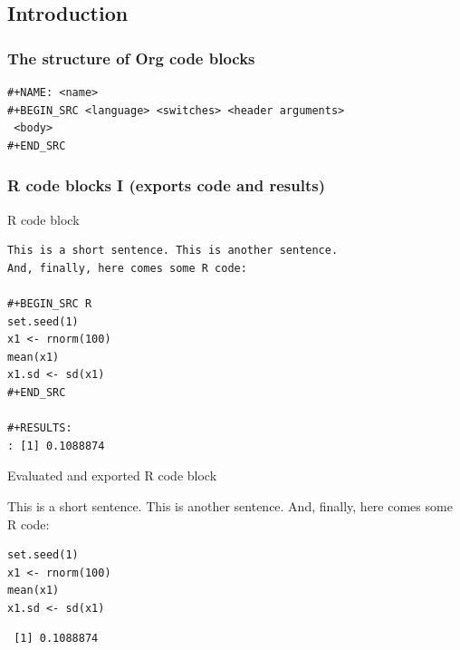 \documentclass[bigger]{beamer}
\begin{document}
\subsection{Introduction}
\label{sec-3-1}
\begin{frame}[fragile]
\frametitle{The structure of Org code blocks}
\label{sec-3-1-1}


\begin{small}

\begin{verbatim}
#+NAME: <name>
#+BEGIN_SRC <language> <switches> <header arguments>
 <body>
#+END_SRC
\end{verbatim}
\end{small}
\end{frame}
\begin{frame}[fragile,t, shrink = 15]
\frametitle{R code blocks I (exports code and results)}
\label{sec-3-1-2}
\begin{block}{R code block}
\label{sec-3-1-2-1}


\begin{verbatim}
This is a short sentence. This is another sentence. 
And, finally, here comes some R code:

#+BEGIN_SRC R
set.seed(1)
x1 <- rnorm(100) 
mean(x1) 
x1.sd <- sd(x1) 
#+END_SRC

#+RESULTS:
: [1] 0.1088874
\end{verbatim}
\end{block}
\begin{block}{Evaluated and exported R code block}
\label{sec-3-1-2-2}


This is a short sentence. This is another sentence. And, finally, here comes some R code:

\lstset{language=R}
\begin{lstlisting}
set.seed(1)
x1 <- rnorm(100)
mean(x1)
x1.sd <- sd(x1)
\end{lstlisting}

\begin{verbatim}
 [1] 0.1088874
\end{verbatim}
\end{block}
\end{frame}
\end{document}
